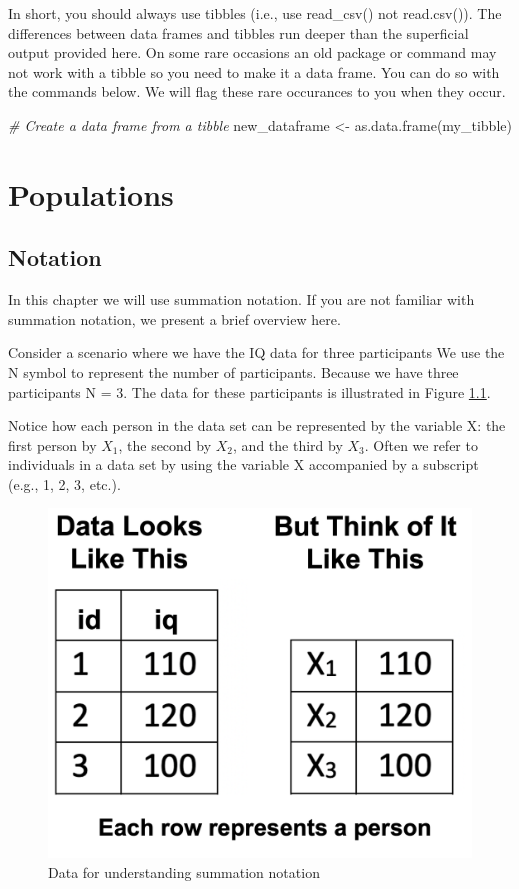 \documentclass[
]{krantz}
\makeatletter
\newenvironment{Shaded}{\begin{snugshade}}{\end{snugshade}}
\newcommand{\CommentTok}[1]{\textcolor[rgb]{0.37,0.37,0.37}{\textit{#1}}}
\newcommand{\FunctionTok}[1]{\textcolor[rgb]{0,0,0}{#1}}
\newcommand{\NormalTok}[1]{#1}
\newcommand{\OtherTok}[1]{\textcolor[rgb]{0.37,0.37,0.37}{#1}}
\newenvironment{kframe}{%
\medskip{}
\setlength{\fboxsep}{.8em}
 \def\at@end@of@kframe{}%
 \ifinner\ifhmode%
  \def\at@end@of@kframe{\end{minipage}}%
  \begin{minipage}{\columnwidth}%
 \fi\fi%
 \def\FrameCommand##1{\hskip\@totalleftmargin \hskip-\fboxsep
 \colorbox{shadecolor}{##1}\hskip-\fboxsep
     \hskip-\linewidth \hskip-\@totalleftmargin \hskip\columnwidth}%
 \MakeFramed {\advance\hsize-\width
   \@totalleftmargin\z@ \linewidth\hsize
   \@setminipage}}%
 {\par\unskip\endMakeFramed%
 \at@end@of@kframe}
\renewenvironment{Shaded}{\begin{kframe}}{\end{kframe}}
\makeatother
\begin{document}
In short, you should always use tibbles (i.e., use read\_csv() not read.csv()). The differences between data frames and tibbles run deeper than the superficial output provided here. On some rare occasions an old package or command may not work with a tibble so you need to make it a data frame. You can do so with the commands below. We will flag these rare occurances to you when they occur.

\begin{Shaded}
\begin{Highlighting}[]
\CommentTok{\# Create a data frame from a tibble}
\NormalTok{new\_dataframe }\OtherTok{\textless{}{-}} \FunctionTok{as.data.frame}\NormalTok{(my\_tibble)}
\end{Highlighting}
\end{Shaded}

\hypertarget{populations}{%
\chapter{Populations}\label{populations}}

\hypertarget{notation}{%
\section{Notation}\label{notation}}

In this chapter we will use summation notation. If you are not familiar with summation notation, we present a brief overview here.

Consider a scenario where we have the IQ data for three participants We use the N symbol to represent the number of participants. Because we have three participants N = 3. The data for these participants is illustrated in Figure \ref{fig:notationdata}.

Notice how each person in the data set can be represented by the variable X: the first person by \(X_1\), the second by \(X_2\), and the third by \(X_3\). Often we refer to individuals in a data set by using the variable X accompanied by a subscript (e.g., 1, 2, 3, etc.).

\begin{figure}
\includegraphics[width=0.4\linewidth]{ch_populations/images/screenshot_data_n6} \caption{Data for understanding summation notation}\label{fig:notationdata}
\end{figure}
\end{document}
